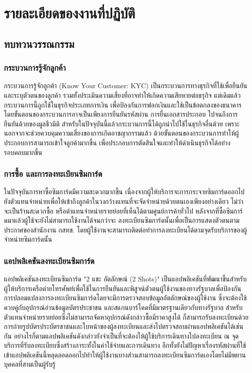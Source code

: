 \chapter{รายละเอียดของงานที่ปฏิบัติ}
\label{chapter:related-theory}

\section{ทบทวนวรรณกรรม}

\subsection{กระบวนการรู้จักลูกค้า}
กระบวนการรู้จักลูกค้า (Know Your Customer: KYC) เป็นกระบวนการทางธุรกิจที่ใช้เพื่อยืนยันและระบุตัวตนของลูกค้า รวมทั้งประเมินความเสี่ยงที่อาจทำให้เกิดความเสียหายต่อธรุกิจ แต่เดิมแล้ว กระบวนการนี้ถูกใช้ในธุรกิจประเภทการเงิน เพื่อป้องกันการฟอกเงินและใช้เป็นข้อตกลงของธนาคาร โดยขั้นตอนของกระบวนการอาจเป็นเพียงการยืนยันรหัสผ่าน การยื่นเอกสารประกอบ ไปจนถึงการยืนยันด้วยของมูลชีวมิติ สำหรับในปัจจุบันนี้แล้วกระบวนการนี้ได้ถูกนำไปใช้ในธุรกิจอื่นด้วย เพราะนอกจากจะช่วยควบคุมความเสี่ยงของการเกิดอาชญากรรมแล้ว ด้วยขั้นตอนของกระบวนการทำให้ผู้ประกอบการสามารถเข้าใจลูกค้ามากขึ้น เพื่อประกอบการตัดสินใจและทำให้ดำเนินธุรกิจได้อย่างรอบคอบมากขึ้น

\subsection{การซื้อ และการลงทะเบียนซิมการ์ด}
ในปัจจุบันการหาซื้อซิมการ์ดมีความสะดวกมากขึ้น เนื่องจากผู้ให้บริการจะการกระจายซิมการ์ดออกไป ยังตัวแทนจำหน่ายเพื่อให้เข้าถึงลูกค้าในวงกว้างแทนที่จะจัดจำหน่ายด้วยตนเองเพียงอย่างเดียว ไม่ว่าจะเป็นร้านสะดวกซื้อ หรือตำแทนจำหน่ายรายย่อยที่เห็นได้ตามศูนย์การค้าทั่วไป หลังจากที่ซื้อซิมการ์ดมาแล้วผู้ใช้จะยังไม่สามารถใช้งานได้จนกว่าจะ ลงทะเบียนซิมการ์ดนั้นเพื่อเป็นการแสดงตัวตนตามประกาศของสำนักงาน กสทช. โดยผู้ใช้งานจะสามารถติดต่อทำการลงทะเบียนได้ตามจุดรับบริการของผู้จำหน่ายซิมการ์ดนั้น

\subsection{แอปพลิเคชันลงทะเบียนซิมการ์ด}
แอปพลิเคชันลงทะเบียนซิมการ์ด "2 แชะ อัตลักษณ์ (2 Shots)" เป็นแอปพลิเคชันที่พัฒนาขึ้นสำหรับผู้ให้บริการเครือค่ายโทรศัพท์เพื่อใช้ในการยืนยันและพิสูจน์ตัวตนผู้ใช้งานของทางรัฐบาลเพื่อป้องกันการปลอมแปลงการลงทะเบียนซิมการ์ดโดยจะมีการตรวจสอบข้อมูลอัตลักษณ์ของผู้ใช้งาน ซึ่งจะต้องใช้ควบคู่กับอุปกรณ์อ่านข้อมูลบัตรประชาชน และสแกนบาร์โคดที่มีมาตรฐานเดียวกับทางรัฐบาล สำหรับตัวแทนจำหน่ายรายย่อยซึ่งไม่สามารถจัดหาอุปกรณ์ดังกล่าวซื้อมีราคาสูงได้ ก็สามารถรับลงทะเบียนด้วยการถ่ายรูปบัตรประบัตรชาชนและใบหน้าของผู้ลงทะเบียนและส่งไปตรวจสอบผ่านแอปพลิเคชันได้เช่นกัน อย่างไรก็ตามแอปพลิเคชันดังกล่าวยังจำเป็นที่จะต้องให้ผู้ใช้บริการเดินทางไปลงทะเบียน ณ จุดบริการที่รับลงทะเบียบซึ่งสร้างภาระทั้งในค่าใช้จ่ายและการเดินทาง อีกทั้งยังไม่ปัญหาเรื่องรหัสผ่านที่ใช้เข้าแอปพลิเคชันนี้หลุดลอดออกไปทำให้ผู้ใช้งานบางส่วนสามารถลงทะเบียนซิมการ์ดเองโดยไม่มีพยานบุคคลที่สามเป็นผู้รับรู้

